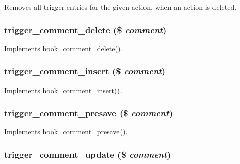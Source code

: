 Removes all trigger entries for the given action, when an action is deleted. \hypertarget{trigger_8module_a3148e799e1bdbe733b0547f6347633b0}{
\subsubsection[{trigger\_\-comment\_\-delete}]{\setlength{\rightskip}{0pt plus 5cm}trigger\_\-comment\_\-delete (\$ {\em comment})}}
\label{trigger_8module_a3148e799e1bdbe733b0547f6347633b0}
Implements \hyperlink{group__hooks_gab8d94c5665313a2d174628cc219f0395}{hook\_\-comment\_\-delete()}. \hypertarget{trigger_8module_ae3d50a8adaedb298afba9d4f9595ccd1}{
\subsubsection[{trigger\_\-comment\_\-insert}]{\setlength{\rightskip}{0pt plus 5cm}trigger\_\-comment\_\-insert (\$ {\em comment})}}
\label{trigger_8module_ae3d50a8adaedb298afba9d4f9595ccd1}
Implements \hyperlink{group__hooks_ga3f972e92f09b1c9e8797fc9037e8c75d}{hook\_\-comment\_\-insert()}. \hypertarget{trigger_8module_a5cfb14fd7c7831d620e63e414ed58fd2}{
\subsubsection[{trigger\_\-comment\_\-presave}]{\setlength{\rightskip}{0pt plus 5cm}trigger\_\-comment\_\-presave (\$ {\em comment})}}
\label{trigger_8module_a5cfb14fd7c7831d620e63e414ed58fd2}
Implements \hyperlink{group__hooks_gaaa06736884e98ef79711f70af9d1a266}{hook\_\-comment\_\-presave()}. \hypertarget{trigger_8module_a816f11378edc4880420922ae9fc63474}{
\subsubsection[{trigger\_\-comment\_\-update}]{\setlength{\rightskip}{0pt plus 5cm}trigger\_\-comment\_\-update (\$ {\em comment})}}

